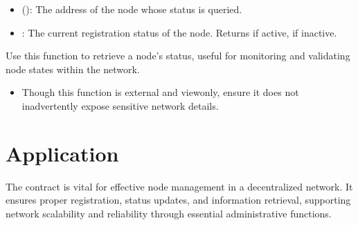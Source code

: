 \documentclass[a4paper,10pt,english]{sphinxmanual}
\begin{document}
\sphinxAtStartPar
{}
\begin{itemize}
\item {} 
\sphinxAtStartPar
{} ():
The address of the node whose status is queried.

\end{itemize}

\sphinxAtStartPar
{}
\begin{itemize}
\item {} 
\sphinxAtStartPar
{}:
The current registration status of the node. Returns  if active,  if inactive.

\end{itemize}

\sphinxAtStartPar
{}

\sphinxAtStartPar
Use this function to retrieve a node’s status, useful for monitoring and validating node states within the network.

\sphinxAtStartPar
{}
\begin{itemize}
\item {} 
\sphinxAtStartPar
{} Though this function is external and view\sphinxhyphen{}only, ensure it does not inadvertently expose sensitive network details.

\end{itemize}


\section{Application}
\label{\detokenize{docs_node_manager_contract:application}}
\sphinxAtStartPar
The  contract is vital for effective node management in a decentralized network. It ensures proper registration, status updates, and information retrieval, supporting network scalability and reliability through essential administrative functions.
\end{document}
